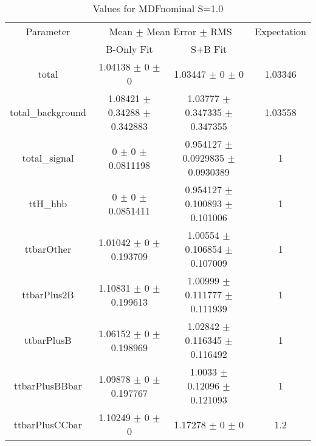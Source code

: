 \begin{table}
\centering
\caption{Values for MDFnominal S=1.0}
\begin{tabular}{cccc}
\toprule
Parameter & \multicolumn{2}{c}{Mean $\pm$ Mean Error $\pm$ RMS} & Expectation\\
 & B-Only Fit & S+B Fit & \\
\midrule
total & \num{1.04138} $\pm$ \num{0} $\pm$ \num{0} & \num{1.03447} $\pm$ \num{0} $\pm$ \num{0} & \num{1.03346}\\
total\_background & \num{1.08421} $\pm$ \num{0.34288} $\pm$ \num{0.342883} & \num{1.03777} $\pm$ \num{0.347335} $\pm$ \num{0.347355} & \num{1.03558}\\
total\_signal & \num{0} $\pm$ \num{0} $\pm$ \num{0.0811198} & \num{0.954127} $\pm$ \num{0.0929835} $\pm$ \num{0.0930389} & \num{1}\\
ttH\_hbb & \num{0} $\pm$ \num{0} $\pm$ \num{0.0851411} & \num{0.954127} $\pm$ \num{0.100893} $\pm$ \num{0.101006} & \num{1}\\
ttbarOther & \num{1.01042} $\pm$ \num{0} $\pm$ \num{0.193709} & \num{1.00554} $\pm$ \num{0.106854} $\pm$ \num{0.107009} & \num{1}\\
ttbarPlus2B & \num{1.10831} $\pm$ \num{0} $\pm$ \num{0.199613} & \num{1.00999} $\pm$ \num{0.111777} $\pm$ \num{0.111939} & \num{1}\\
ttbarPlusB & \num{1.06152} $\pm$ \num{0} $\pm$ \num{0.198969} & \num{1.02842} $\pm$ \num{0.116345} $\pm$ \num{0.116492} & \num{1}\\
ttbarPlusBBbar & \num{1.09878} $\pm$ \num{0} $\pm$ \num{0.197767} & \num{1.0033} $\pm$ \num{0.12096} $\pm$ \num{0.121093} & \num{1}\\
ttbarPlusCCbar & \num{1.10249} $\pm$ \num{0} $\pm$ \num{0} & \num{1.17278} $\pm$ \num{0} $\pm$ \num{0} & \num{1.2}\\
\bottomrule
\end{tabular}
\end{table}